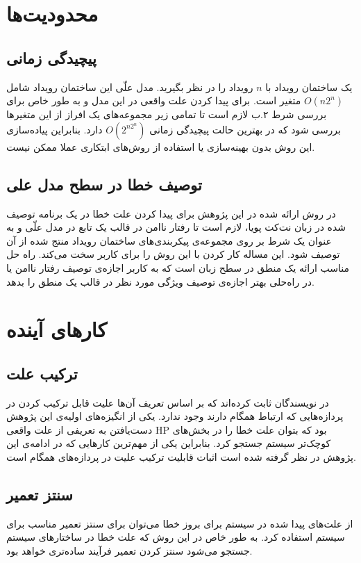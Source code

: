 \section{محدودیت‌ها}
\subsection{پیچیدگی زمانی}
یک ساختمان رویداد با 
$n$
رویداد را در نظر بگیرید.
مدل علّی این ساختمان رویداد شامل 
$O(n2^n)$
متغیر است.
برای پیدا کردن علت واقعی در این مدل و به طور خاص برای بررسی شرط ۲.ب لازم است تا تمامی زیر مجموعه‌های یک افراز از این متغیر‌ها بررسی شود که در بهترین حالت پیچیدگی زمانی
$O(2^{n2^n})$
دارد.
بنابراین پیاده‌سازی این روش بدون بهینه‌سازی یا استفاده از روش‌های ابتکاری عملا ممکن نیست.
\subsection{توصیف خطا در سطح مدل علی}
در روش ارائه شده در این پژوهش برای پیدا کردن علت خطا در یک برنامه توصیف شده در زبان نت‌کت پویا، لازم است تا رفتار ناامن در قالب یک تابع در مدل علّی و به عنوان یک شرط بر روی مجموعه‌ی پیکربندی‌های ساختمان رویداد منتج شده از‌ آن توصیف شود.
این مساله کار کردن با این روش را برای کاربر سخت می‌کند. 
راه حل مناسب ارائه یک منطق در سطح زبان است که به کاربر اجازه‌ی توصیف رفتار ناامن یا در راه‌حلی بهتر اجازه‌ی توصیف ویژگی مورد نظر در قالب یک منطق را بدهد.

\section{کار‌های آینده}

\subsection{ترکیب علت}
در 
\cite{causal-hml}
نویسندگان ثابت کرده‌اند که بر اساس تعریف آن‌ها علیت قابل ترکیب کردن در پردازه‌هایی که ارتباط همگام دارند وجود ندارد.
یکی از انگیزه‌های اولیه‌ی این پژوهش دست‌یافتن به تعریفی از علت واقعی
HP
بود که بتوان علت خطا را در بخش‌های کوچک‌تر سیستم جستجو کرد.
بنابراین یکی از مهم‌ترین کار‌هایی که در ادامه‌ی این پژوهش در نظر گرفته شده است اثبات قابلیت ترکیب علیت در پردازه‌های همگام است.

\subsection{سنتز تعمیر}
از علت‌های پیدا شده در سیستم برای بروز خطا می‌توان برای سنتز تعمیر مناسب برای سیستم استفاده کرد.
به طور خاص در این روش که علت خطا در ساختار‌های سیستم جستجو می‌شود سنتز کردن تعمیر فرآیند ساده‌تری خواهد بود.
